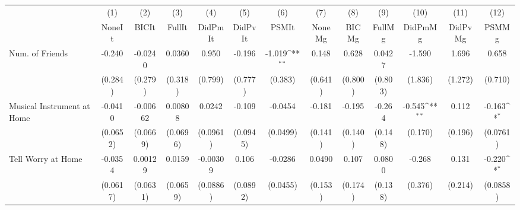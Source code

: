 {
\def\sym#1{\ifmmode^{#1}\else\(^{#1}\)\fi}
\begin{tabular}{l*{12}{c}}
\toprule
            &\multicolumn{1}{c}{(1)}&\multicolumn{1}{c}{(2)}&\multicolumn{1}{c}{(3)}&\multicolumn{1}{c}{(4)}&\multicolumn{1}{c}{(5)}&\multicolumn{1}{c}{(6)}&\multicolumn{1}{c}{(7)}&\multicolumn{1}{c}{(8)}&\multicolumn{1}{c}{(9)}&\multicolumn{1}{c}{(10)}&\multicolumn{1}{c}{(11)}&\multicolumn{1}{c}{(12)}\\
            &\multicolumn{1}{c}{NoneIt}&\multicolumn{1}{c}{BICIt}&\multicolumn{1}{c}{FullIt}&\multicolumn{1}{c}{DidPmIt}&\multicolumn{1}{c}{DidPvIt}&\multicolumn{1}{c}{PSMIt}&\multicolumn{1}{c}{NoneMg}&\multicolumn{1}{c}{BICMg}&\multicolumn{1}{c}{FullMg}&\multicolumn{1}{c}{DidPmMg}&\multicolumn{1}{c}{DidPvMg}&\multicolumn{1}{c}{PSMMg}\\
\midrule
Num. of Friends&      -0.240         &     -0.0240         &      0.0360         &       0.950         &      -0.196         &      -1.019\sym{**} &       0.148         &       0.628         &      0.0427         &      -1.590         &       1.696         &       0.658         \\
            &     (0.284)         &     (0.279)         &     (0.318)         &     (0.799)         &     (0.777)         &     (0.383)         &     (0.641)         &     (0.800)         &     (0.803)         &     (1.836)         &     (1.272)         &     (0.710)         \\
\addlinespace
Musical Instrument at Home&     -0.0410         &    -0.00662         &     0.00808         &      0.0242         &      -0.109         &     -0.0454         &      -0.181         &      -0.195         &      -0.264         &      -0.545\sym{**} &       0.112         &      -0.163\sym{*}  \\
            &    (0.0652)         &    (0.0669)         &    (0.0696)         &    (0.0961)         &    (0.0945)         &    (0.0499)         &     (0.141)         &     (0.140)         &     (0.148)         &     (0.170)         &     (0.196)         &    (0.0761)         \\
\addlinespace
Tell Worry at Home&     -0.0354         &     0.00129         &      0.0159         &    -0.00309         &       0.106         &     -0.0286         &      0.0490         &       0.107         &      0.0800         &      -0.268         &       0.131         &      -0.220\sym{*}  \\
            &    (0.0617)         &    (0.0631)         &    (0.0659)         &    (0.0886)         &    (0.0892)         &    (0.0455)         &     (0.153)         &     (0.174)         &     (0.138)         &     (0.376)         &     (0.214)         &    (0.0858)         \\

\end{tabular}}
